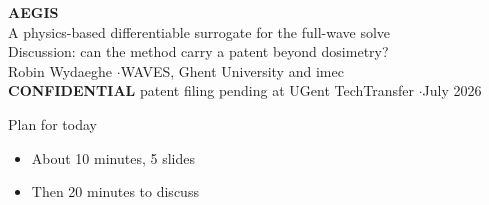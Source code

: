 \documentclass[aspectratio=169, 10pt]{beamer}
\begin{document}
\begin{frame}[plain]
  \vfill
  \begin{center}
    {\Large\color{navyblue}\bfseries AEGIS}\\[6pt]
    {\normalsize A physics-based differentiable surrogate for the full-wave solve}\\[14pt]
    {\small Discussion: can the method carry a patent beyond dosimetry?}\\[2pt]
    {\footnotesize Robin Wydaeghe \quad$\cdot$\quad WAVES, Ghent University and imec}\\[10pt]
    {\footnotesize\color{alertred}\textbf{CONFIDENTIAL}}\quad
    {\footnotesize\color{darkgray} patent filing pending at UGent TechTransfer \quad$\cdot$\quad July 2026}
  \end{center}
  \vfill
\end{frame}

\begin{frame}{Plan for today}
  \vspace{10pt}
  \begin{itemize}\setlength\itemsep{10pt}
    \item About 10 minutes, 5 slides
    \item Then 20 minutes to discuss
  \end{itemize}
\end{frame}

\end{document}
